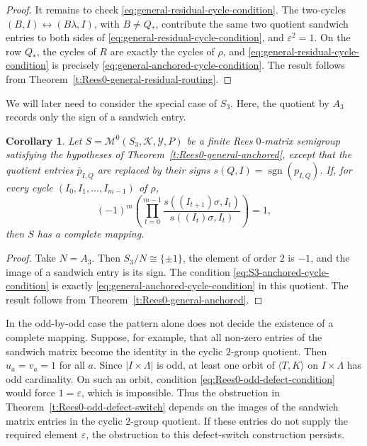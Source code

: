 \documentclass[11pt]{article}
\theoremstyle{plain}
\newtheorem{cor}[theorem]{Corollary}
\theoremstyle{remark}
\theoremstyle{definition}
\theoremstyle{plain}
\DeclareMathOperator{\sgn}{sgn}
\begin{document}
\begin{proof}
It remains to check \eqref{eq:general-residual-cycle-condition}. The two-cycles
$(B,I)\leftrightarrow(B\lambda,I)$, with $B\ne Q_\ast$, contribute the same two
quotient sandwich entries to both sides of
\eqref{eq:general-residual-cycle-condition}, and $\varepsilon^2=1$. On the
row $Q_\ast$, the cycles of $R$ are exactly the cycles of $\rho$, and
\eqref{eq:general-residual-cycle-condition} is precisely
\eqref{eq:general-anchored-cycle-condition}. The result follows from Theorem~\ref{t:Rees0-general-residual-routing}.
\end{proof}

We will later need to consider the special case of $S_3$. Here, the quotient by $A_3$ records only the sign of a sandwich entry.

\begin{cor}\label{c:Rees0-S3-anchored}
Let
\(S=\mathcal M^0(S_3,\mathcal K,\mathcal Y,P)\)
be a finite Rees $0$-matrix semigroup satisfying the hypotheses of
Theorem~\ref{t:Rees0-general-anchored}, except that the quotient entries
$\bar p_{I,Q}$ are replaced by their signs
\(s(Q,I)=\sgn(p_{I,Q}).\)
If, for every cycle $(I_0,I_1,\ldots,I_{m-1})$ of $\rho$,
\begin{equation}\label{eq:S3-anchored-cycle-condition}
        (-1)^m
        \left(
        \prod_{t=0}^{m-1}
        \frac{s((I_{t+1})\sigma,I_t)}{s((I_t)\sigma,I_t)}
        \right)=1,
\end{equation}
then $S$ has a complete mapping.
\end{cor}

\begin{proof}
Take $N=A_3$. Then $S_3/N\cong\{\pm1\}$, the element of order $2$ is $-1$, and the image
of a sandwich entry is its sign. The condition
\eqref{eq:S3-anchored-cycle-condition} is exactly
\eqref{eq:general-anchored-cycle-condition} in this quotient. The result
follows from Theorem~\ref{t:Rees0-general-anchored}.
\end{proof}

In the odd-by-odd case the pattern alone does not decide the existence of a
complete mapping. Suppose, for example, that all non-zero entries of the
sandwich matrix become the identity in the cyclic $2$-group quotient. Then
$u_a=v_a=1$ for all $a$. Since
 $|I\times\Lambda|$
is odd, at least one orbit of $\langle T,K\rangle$ on $I\times\Lambda$ has odd
cardinality. On such an orbit, condition
\eqref{eq:Rees0-odd-defect-condition} would force
$1=\varepsilon$,
which is impossible. Thus the obstruction in
Theorem~\ref{t:Rees0-odd-defect-switch} depends on the images of the sandwich
matrix entries in the cyclic $2$-group quotient. If these entries do not supply
the required element $\varepsilon$, the obstruction to this defect-switch construction persists.
\end{document}
